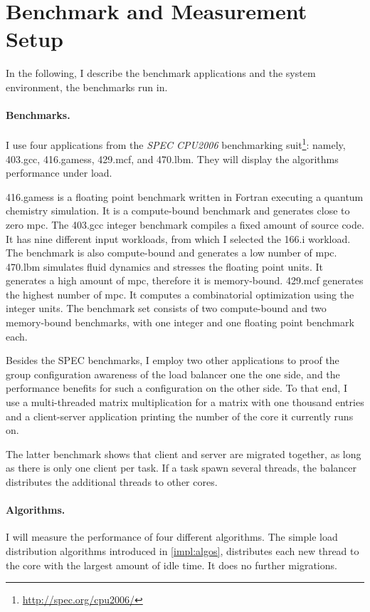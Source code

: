 \section{Benchmark and Measurement Setup}

In the following, I describe the benchmark applications and the
system environment, the benchmarks run in.

\paragraph{Benchmarks.}
I use four applications from the \emph{SPEC CPU2006} benchmarking
suit\footnote{\url{http://spec.org/cpu2006/}}:
namely, 403.gcc, 416.gamess, 429.mcf, and 470.lbm.
They will display the algorithms performance under load.

416.gamess is a floating point benchmark written in Fortran executing a quantum
chemistry simulation.
It is a compute-bound benchmark and generates close to zero \gls{mpc}.
The 403.gcc integer benchmark compiles a fixed amount of source code.
It has nine different input workloads, from which I selected the 166.i
workload.
The benchmark is also compute-bound and generates a low number of \gls{mpc}.
470.lbm simulates fluid dynamics and stresses the floating point units.
It generates a high amount of \gls{mpc}, therefore it is memory-bound.
429.mcf generates the highest number of \gls{mpc}.
It computes a combinatorial optimization using the integer units.
The benchmark set consists of two compute-bound and two memory-bound
benchmarks, with one integer and one floating point benchmark each.

Besides the SPEC benchmarks, I employ two other applications to proof the
group configuration awareness of the load balancer one the one side, and the
performance benefits for such a configuration on the other side.
To that end, I use a multi-threaded matrix multiplication for a matrix with
one thousand entries and a client-server application printing the number of the
core it currently runs on.

The latter benchmark shows that client and server are migrated together, as
long as there is only one client per task.
If a task spawn several threads, the balancer distributes the additional
threads to other cores.


\paragraph{Algorithms.}
I will measure the performance of four different algorithms.
The simple load distribution algorithms introduced in \ref{impl:algos},
distributes each new thread to the core with the largest amount of idle time.
It does no further migrations.

